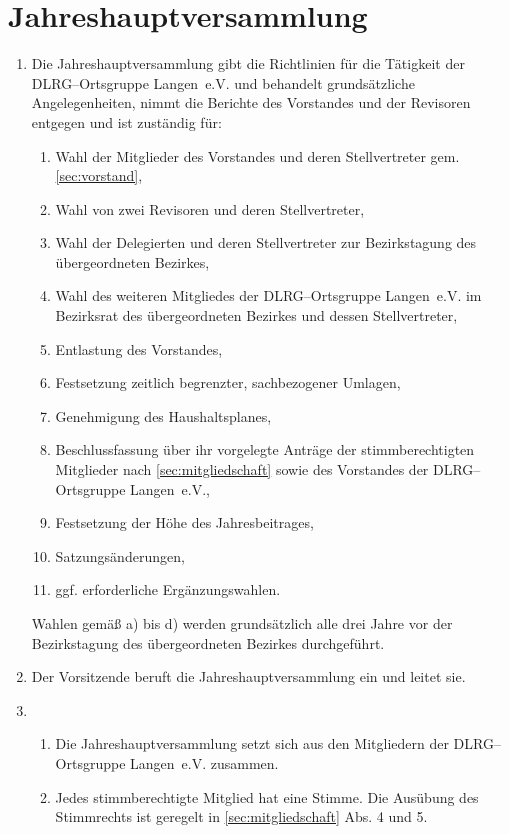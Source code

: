 \documentclass[%
12pt, %
a4paper, %
headsepline, %
footsepline, %
parskip, %
headings=normal, %
]{scrartcl}
\begin{document}
\section{Jahreshauptversammlung}
\label{sec:jahreshauptversammlung}
\begin{enumerate}
    \item Die Jahreshauptversammlung gibt die Richtlinien für die Tätigkeit der DLRG--Ortsgruppe Langen~e.V. und behandelt grundsätzliche Angelegenheiten, nimmt die Berichte des Vorstandes und der Revisoren entgegen und ist zuständig für: \begin{enumerate}[noitemsep]
        \item Wahl der Mitglieder des Vorstandes und deren Stellvertreter gem. \ref{sec:vorstand},
        \item Wahl von zwei Revisoren und deren Stellvertreter,
        \item Wahl der Delegierten und deren Stellvertreter zur Bezirkstagung des übergeordneten Bezirkes,
        \item Wahl des weiteren Mitgliedes der DLRG--Ortsgruppe Langen~e.V. im Bezirksrat des übergeordneten Bezirkes und dessen Stellvertreter,
        \item Entlastung des Vorstandes,
        \item Festsetzung zeitlich begrenzter, sachbezogener Umlagen,
        \item Genehmigung des Haushaltsplanes,
        \item Beschlussfassung über ihr vorgelegte Anträge der stimmberechtigten Mitglieder nach \ref{sec:mitgliedschaft} sowie des Vorstandes der DLRG--Ortsgruppe Langen~e.V.,
        \item Festsetzung der Höhe des Jahresbeitrages,
        \item Satzungsänderungen,
        \item ggf. erforderliche Ergänzungswahlen.
    \end{enumerate}
    Wahlen gemäß a) bis d) werden grundsätzlich alle drei Jahre vor der Bezirkstagung des übergeordneten Bezirkes durchgeführt.
    \item Der Vorsitzende beruft die Jahreshauptversammlung ein und leitet sie.
    \item \begin{enumerate}[noitemsep]
        \item Die Jahreshauptversammlung setzt sich aus den Mitgliedern der DLRG--Ortsgruppe Langen~e.V. zusammen.
        \item Jedes stimmberechtigte Mitglied hat eine Stimme. Die Ausübung des Stimmrechts ist geregelt in \ref{sec:mitgliedschaft} Abs. 4 und 5.

\end{enumerate}
\end{enumerate}
\end{document}
